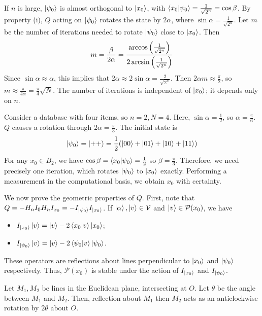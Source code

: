 If \( n \) is large, \( \ket{\psi_0} \) is almost orthogonal to \( \ket{x_0} \), with \( \ip{x_0}{\psi_0} = \frac{1}{\sqrt{2^n}} = \cos \beta \).
By property (i), \( Q \) acting on \( \ket{\psi_0} \) rotates the state by \( 2\alpha \), where \( \sin\alpha = \frac{1}{\sqrt{2^n}} \).
Let \( m \) be the number of iterations needed to rotate \( \ket{\psi_0} \) close to \( \ket{x_0} \).
Then
\[ m = \frac{\beta}{2\alpha} = \frac{\arccos\qty(\frac{1}{\sqrt{2^n}})}{2\arcsin\qty(\frac{1}{\sqrt{2^n}})} \]
Since \( \sin \alpha \approx \alpha \), this implies that \( 2\alpha \approx 2\sin\alpha = \frac{2}{\sqrt{2^n}} \).
Then \( 2 \alpha m \approx \frac{\pi}{2} \), so \( m \approx \frac{\pi}{4\alpha} = \frac{\pi}{4} \sqrt{N} \).
The number of iterations is independent of \( \ket{x_0} \); it depends only on \( n \).
\begin{example}
    Consider a database with four items, so \( n = 2, N = 4 \).
    Here, \( \sin \alpha = \frac{1}{2} \), so \( \alpha = \frac{\pi}{6} \).
    \( Q \) causes a rotation through \( 2\alpha = \frac{\pi}{3} \).
    The initial state is
    \[ \ket{\psi_0} = \ket{++} = \frac{1}{2}\qty(\ket{00} + \ket{01} + \ket{10} + \ket{11}) \]
    For any \( x_0 \in B_2 \), we have \( \cos\beta = \ip{x_0}{\psi_0} = \frac{1}{2} \) so \( \beta = \frac{\pi}{3} \).
    Therefore, we need precisely one iteration, which rotates \( \ket{\psi_0} \) to \( \ket{x_0} \) exactly.
    Performing a measurement in the computational basis, we obtain \( x_0 \) with certainty.
\end{example}
We now prove the geometric properties of \( Q \).
First, note that \( Q = -H_n I_0 H_n I_{x_0} = -I_{\ket{\psi_0}} I_{\ket{x_0}} \).
If \( \ket{\alpha}, \ket{v} \in \mathcal V \) and \( \ket{v} \in \mathcal P(x_0) \), we have
\begin{itemize}
    \item \( I_{\ket{x_0}} \ket{v} = \ket{v} - 2\ip{x_0}{v} \ket{x_0} \);
    \item \( I_{\ket{\psi_0}} \ket{v} = \ket{v} - 2\ip{\psi_0}{v} \ket{\psi_0} \).
\end{itemize}
These operators are reflections about lines perpendicular to \( \ket{x_0} \) and \( \ket{\psi_0} \) respectively.
Thus, \( \mathcal P(x_0) \) is stable under the action of \( I_{\ket{x_0}} \) and \( I_{\ket{\psi_0}} \).

Let \( M_1, M_2 \) be lines in the Euclidean plane, intersecting at \( O \).
Let \( \theta \) be the angle between \( M_1 \) and \( M_2 \).
Then, reflection about \( M_1 \) then \( M_2 \) acts as an anticlockwise rotation by \( 2\theta \) about \( O \).

